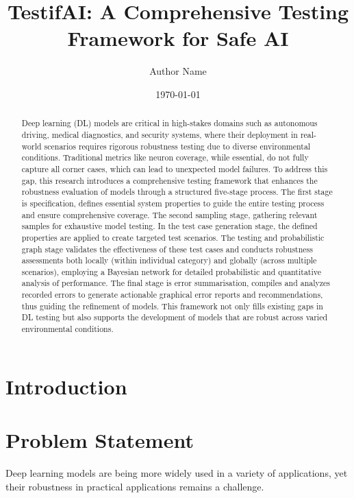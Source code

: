 \documentclass[10pt, conference, a4paper, final]{IEEEtran}
\title{TestifAI: A Comprehensive Testing Framework for Safe AI}
\author{Author Name}
\date{\today}
\begin{document}
\maketitle

\begin{abstract}

    Deep learning (DL) models are critical in high-stakes domains such as autonomous driving, medical diagnostics, and security systems, where their deployment in real-world scenarios requires rigorous robustness testing due to diverse environmental conditions. Traditional metrics like neuron coverage, while essential, do not fully capture all corner cases, which can lead to unexpected model failures. To address this gap, this research introduces a comprehensive testing framework that enhances the robustness evaluation of models through a structured five-stage process. The first stage is specification, defines essential system properties to guide the entire testing process and ensure comprehensive coverage. The second sampling stage, gathering relevant samples for exhaustive model testing. In the test case generation stage, the defined properties are applied to create targeted test scenarios. The testing and probabilistic graph stage validates the effectiveness of these test cases and conducts robustness assessments both locally (within individual category) and globally (across multiple scenarios), employing a Bayesian network for detailed probabilistic and quantitative analysis of performance. The final stage is error summarisation, compiles and analyzes recorded errors to generate actionable graphical error reports and recommendations, thus guiding the refinement of models. This framework not only fills existing gaps in DL testing but also supports the development of models that are robust across varied environmental conditions.
\end{abstract}


\section{Introduction}

\section{Problem Statement}

Deep learning models are being more widely used in a variety of applications, yet their robustness in practical applications remains a challenge.
\end{document}
